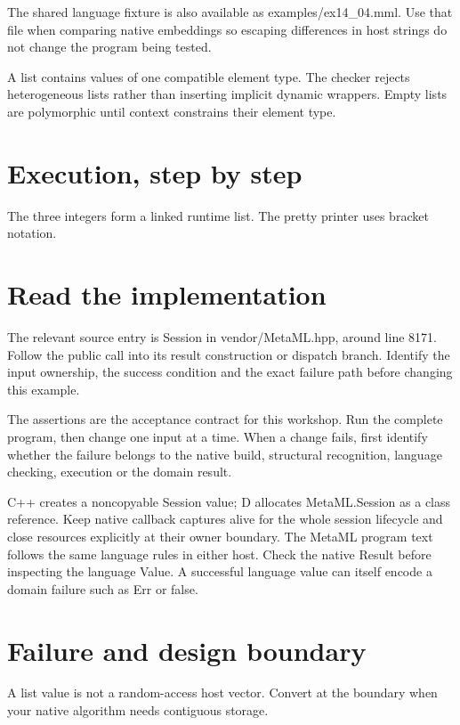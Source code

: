 The shared language fixture is also available as examples/ex14\_04.mml. Use that file when comparing native embeddings so escaping differences in host strings do not change the program being tested.

\clearpage
{}
A list contains values of one compatible element type. The checker rejects heterogeneous lists rather than inserting implicit dynamic wrappers. Empty lists are polymorphic until context constrains their element type.


\section*{Execution, step by step}
The three integers form a linked runtime list. The pretty printer uses bracket notation.

\section*{Read the implementation}
The relevant source entry is Session in vendor/MetaML.hpp, around line 8171. Follow the public call into its result construction or dispatch branch. Identify the input ownership, the success condition and the exact failure path before changing this example.

The assertions are the acceptance contract for this workshop. Run the complete program, then change one input at a time. When a change fails, first identify whether the failure belongs to the native build, structural recognition, language checking, execution or the domain result.

\clearpage
{}
C++ creates a noncopyable Session value; D allocates MetaML.Session as a class reference. Keep native callback captures alive for the whole session lifecycle and close resources explicitly at their owner boundary. The MetaML program text follows the same language rules in either host. Check the native Result before inspecting the language Value. A successful language value can itself encode a domain failure such as Err or false.


\section*{Failure and design boundary}
A list value is not a random-access host vector. Convert at the boundary when your native algorithm needs contiguous storage.

